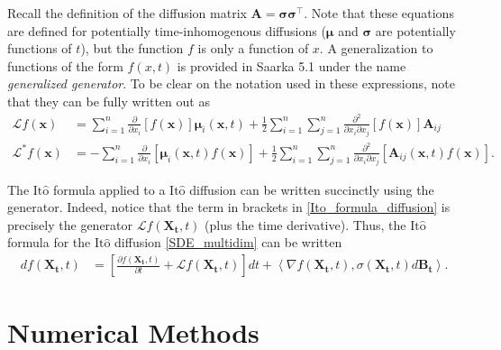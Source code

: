 \documentclass[12pt]{article}
\newcommand{\B}[1]{\boldsymbol{#1}}
\newcommand{\bx}{\mathbf{x}}
\newcommand{\state}[1][t]{X_{#1}}
\newcommand{\BM}[1][t]{B_{#1}} %
\newcommand{\gen}{\mathcal{L}} %
\newcommand{\ito}{\text{It}\hat{\text{o}}}
\newcommand{\dimState}{n}
\newcommand{\diffMat}{\mathbf{A}} %
\begin{document}
Recall the definition of the diffusion matrix $\diffMat = \B\sigma \B\sigma^\top$. Note that these equations are defined for potentially time-inhomogenous diffusions 
($\B\mu$ and $\B\sigma$ are potentially functions of $t$), but the function $f$ is only a function of $x$. A generalization to functions of the form 
$f(x,t)$ is provided in Saarka 5.1 under the name \textit{generalized generator}. To be clear on the notation used in these expressions, note that they 
can be fully written out as 
\begin{align*}
\gen f(\bx) &= \sum_{i=1}^{\dimState} \frac{\partial}{\partial x_i} \left[f(\bx)\right] \B\mu_i(\bx,t) + 
\frac{1}{2}\sum_{i=1}^{\dimState}\sum_{j=1}^{\dimState} \frac{\partial^2}{\partial x_i \partial x_j}\left[f(\bx)\right] \diffMat_{ij} \\
\gen^* f(\bx) 
&= -\sum_{i=1}^{\dimState} \frac{\partial}{\partial x_i}\left[\B\mu_i(\B{x},t)f(\B{x}) \right] + \frac{1}{2} \sum_{i=1}^{\dimState}\sum_{j=1}^{\dimState} \frac{\partial^2}{\partial x_i \partial x_j}\left[\diffMat_{ij}(\bx,t)f(\bx) \right].
\end{align*}

The $\ito$ formula applied to a $\ito$ diffusion can be written succinctly using the generator. Indeed, notice that the term in brackets in \ref{Ito_formula_diffusion} is precisely the 
generator $\gen f(\B\state, t)$ (plus the time derivative). Thus, the $\ito$ formula for the $\ito$ diffusion \ref{SDE_multidim} can be written 
\begin{align}
df(\B\state, t) &= \left[\frac{\partial f(\B\state,t)}{\partial t} + \gen f(\B\state, t)\right] dt + \left\langle \nabla f(\B\state,t), \sigma(\B\state, t) d\B\BM  \right\rangle.
\end{align}

\section{Numerical Methods}



\end{document}
